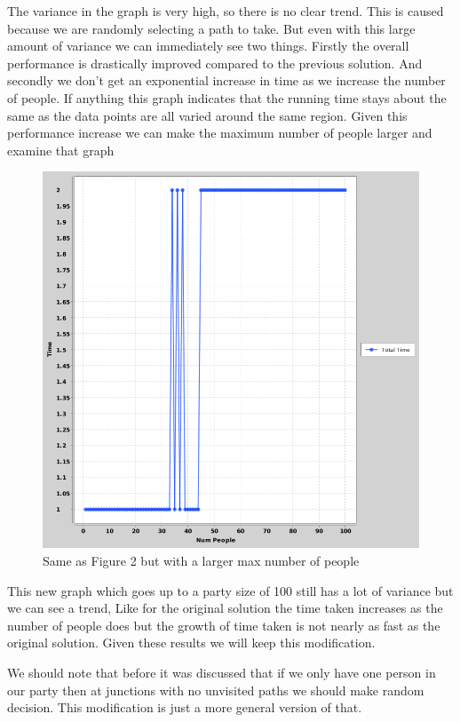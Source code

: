 \documentclass[a4paper, 12pt]{article}
\begin{document}
			The variance in the graph is very high, so there is no clear trend. This is caused because we are randomly selecting a path to take. But even with this large amount of variance we can immediately see two things. Firstly the overall performance is drastically improved compared to the previous solution. And secondly we don't get an exponential increase in time as we increase the number of people. If anything this graph indicates that the running time stays about the same as the data points are all varied around the same region. Given this performance increase we can make the maximum number of people larger and examine that graph
			
			\begin{figure}[H]
				\centering
				\includegraphics[scale=0.4]{numpeople-vs-time(split-for-unvisted)2}
				\caption{Same as Figure 2 but with a larger max number of people}
			\end{figure}
			
			This new graph which goes up to a party size of 100 still has a lot of variance but we can see a trend, Like for the original solution the time taken increases as the number of people does but the growth of time taken is not nearly as fast as the original solution. Given these results we will keep this modification.
			
			We should note that before it was discussed that if we only have one person in our party then at junctions with no unvisited paths we should make random decision. This modification is just a more general version of that.
		
\end{document}
